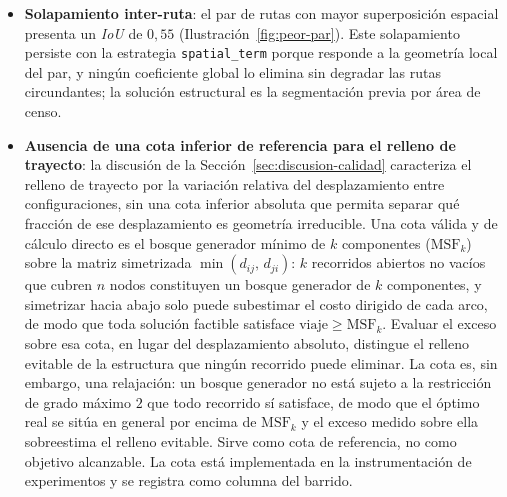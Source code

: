 \begin{itemize}
  \item \textbf{Solapamiento inter-ruta}: el par de rutas con mayor superposición espacial
  presenta un \textit{IoU} de $0{,}55$ (Ilustración~\ref{fig:peor-par}). Este solapamiento
  persiste con la estrategia \texttt{spatial\_term} porque responde a la geometría local
  del par, y ningún coeficiente global lo elimina sin degradar las rutas circundantes; la
  solución estructural es la segmentación previa por área de censo.

  \item \textbf{Ausencia de una cota inferior de referencia para el relleno de
  trayecto}: la discusión de la Sección~\ref{sec:discusion-calidad} caracteriza el
  relleno de trayecto por la variación relativa del desplazamiento entre
  configuraciones, sin una cota inferior absoluta que permita separar qué fracción de
  ese desplazamiento es geometría irreducible. Una cota válida y de cálculo directo es
  el bosque generador mínimo de $k$ componentes ($\text{MSF}_k$)
  \citep{kruskal1956shortest} sobre la matriz simetrizada $\min(d_{ij},\,d_{ji})$: $k$ recorridos abiertos no vacíos que cubren
  $n$ nodos constituyen un bosque generador de $k$ componentes, y simetrizar hacia
  abajo solo puede subestimar el costo dirigido de cada arco, de modo que toda
  solución factible satisface $\text{viaje} \geq \text{MSF}_k$. Evaluar el exceso sobre esa
  cota, en lugar del desplazamiento absoluto, distingue el relleno evitable de la
  estructura que ningún recorrido puede eliminar. La cota es, sin embargo, una
  relajación: un bosque generador no está sujeto a la restricción de grado máximo $2$
  que todo recorrido sí satisface, de modo que el óptimo real se sitúa en general por
  encima de $\text{MSF}_k$ y el exceso medido sobre ella sobreestima el relleno
  evitable. Sirve como cota de referencia, no como objetivo alcanzable. La cota está
  implementada en la instrumentación de experimentos y se registra como columna del
  barrido.


\end{itemize}
